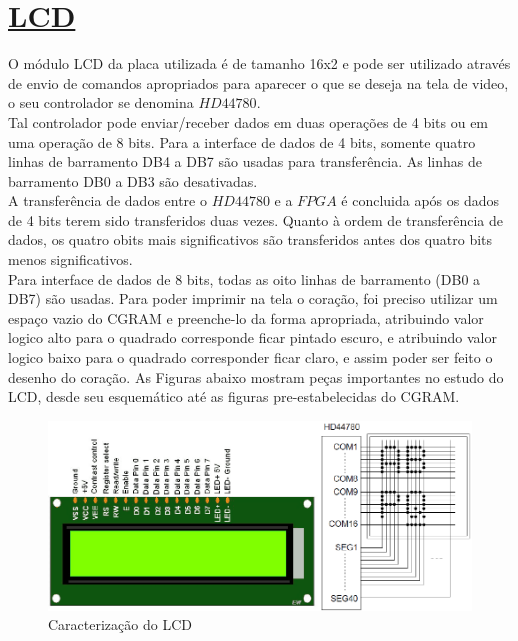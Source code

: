 \documentclass[14pt, oneside]{book}
\newcommand\tab[1][1cm]{\hspace*{#1}}
\theoremstyle{definition}
\begin{document}
            \section[LCD]{\hyperlink{toc}{LCD}}
            \tab O módulo LCD da placa utilizada é de tamanho 16x2 e pode ser utilizado através de envio de comandos apropriados para aparecer o que se deseja na tela de video, o seu controlador se denomina $HD44780$. \\
            \tab Tal controlador pode enviar/receber dados em duas operações de 4 bits ou em uma operação de 8 bits. Para a interface de dados de 4 bits, somente quatro linhas de barramento DB4 a DB7 são usadas para transferência. As linhas de barramento DB0 a DB3 são desativadas. \\
            \tab A transferência de dados entre o $HD44780$ e a $FPGA$ é concluida após os dados de 4 bits terem sido transferidos duas vezes. Quanto à ordem de transferência de dados, os quatro obits mais significativos são transferidos antes dos quatro bits menos significativos. \\
            \tab Para interface de dados de 8 bits, todas as oito linhas de barramento (DB0 a DB7) são usadas.
            \tab Para poder imprimir na tela o coração, foi preciso utilizar um espaço vazio do CGRAM e preenche-lo da forma apropriada, atribuindo valor logico alto para o quadrado corresponde ficar pintado escuro, e atribuindo valor logico baixo para o quadrado corresponder ficar claro, e assim poder ser feito o desenho do coração. As Figuras abaixo mostram peças importantes no estudo do LCD, desde seu esquemático até as figuras pre-estabelecidas do CGRAM.
                \begin{figure}[H]
                    \centering
                    \includegraphics[scale=0.8]{lcd1.png}
                    \caption{Caracterização do LCD}
                    \label{lcd1}
                \end{figure}\\
                
\end{document}

